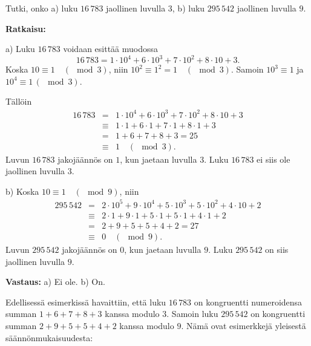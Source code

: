 \begin{esimerkki}
Tutki, onko a) luku $16\, 783$ jaollinen luvulla $3$, b) luku $295\, 542$ jaollinen luvulla $9$.

{\bf Ratkaisu:}

a)
Luku $16\, 783$ voidaan esittää muodossa
\[
16\, 783 = 1 \cdot 10^4 + 6 \cdot 10^3 + 7 \cdot 10^2 + 8 \cdot 10 + 3.
\]
Koska $10 \equiv 1 \quad(\mod 3)$, niin %
$10^2 \equiv 1^2 = 1 \quad (\mod 3)$. Samoin $10^3 \equiv 1$ ja $10^4 \equiv 1 \,(\mod 3)$.

Tällöin %
\begin{eqnarray*}
16\, 783 &=& 1 \cdot 10^4 + 6 \cdot 10^3 + 7 \cdot 10^2 + 8 \cdot 10 + 3\\
&\equiv& 1\cdot 1 + 6\cdot 1 + 7\cdot 1 + 8\cdot 1 + 3%
\\
&=& 1 + 6 + 7 + 8 + 3 = 25 \\
&\equiv& 1 \quad(\mod 3).
\end{eqnarray*}
Luvun $16\, 783$ jakojäännös on $1$, kun jaetaan luvulla $3$. Luku $16\, 783$ ei siis ole jaollinen luvulla $3$.

b) 
Koska $10 \equiv 1 \quad(\mod 9)$, niin 
\begin{eqnarray*}
295\, 542 &=& 2 \cdot 10^5 + 9 \cdot 10^4 + 5 \cdot 10^3 + 5 \cdot 10^2 + 4 \cdot 10 + 2\\
&\equiv& 2\cdot 1 + 9\cdot 1 + 5\cdot 1 + 5\cdot 1 + 4\cdot 1 + 2%
\\
&=& 2 + 9 + 5 + 5 + 4 + 2 = 27 \\
&\equiv& 0 \quad(\mod 9).
\end{eqnarray*}
Luvun $295\, 542$ jakojäännös on $0$, kun jaetaan luvulla $9$. Luku $295\, 542$ on siis jaollinen luvulla $9$.

{\bf Vastaus:} a) Ei ole. b) On.
\end{esimerkki}

Edellisessä esimerkissä havaittiin, että luku $16\, 783$ on kongruentti numeroidensa
summan $1 + 6 + 7 + 8 + 3$ kanssa modulo $3$. Samoin luku $295\, 542$  on kongruentti
summan $2 + 9 + 5 + 5+4+2$ kanssa modulo $9$. Nämä ovat esimerkkejä yleisestä
säännönmukaisuudesta:


